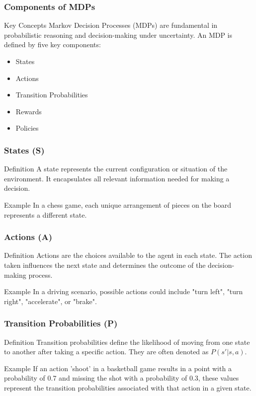 \documentclass[aspectratio=169]{beamer}
\begin{document}
\begin{frame}[fragile]
    \frametitle{Components of MDPs}
    \begin{block}{Key Concepts}
        Markov Decision Processes (MDPs) are fundamental in probabilistic reasoning and decision-making under uncertainty. An MDP is defined by five key components:
        \begin{itemize}
            \item States
            \item Actions
            \item Transition Probabilities
            \item Rewards
            \item Policies
        \end{itemize}
    \end{block}
\end{frame}

\begin{frame}[fragile]
    \frametitle{States (S)}
    \begin{block}{Definition}
        A state represents the current configuration or situation of the environment. It encapsulates all relevant information needed for making a decision.
    \end{block}
    \begin{block}{Example}
        In a chess game, each unique arrangement of pieces on the board represents a different state.
    \end{block}
\end{frame}

\begin{frame}[fragile]
    \frametitle{Actions (A)}
    \begin{block}{Definition}
        Actions are the choices available to the agent in each state. The action taken influences the next state and determines the outcome of the decision-making process.
    \end{block}
    \begin{block}{Example}
        In a driving scenario, possible actions could include "turn left", "turn right", "accelerate", or "brake".
    \end{block}
\end{frame}

\begin{frame}[fragile]
    \frametitle{Transition Probabilities (P)}
    \begin{block}{Definition}
        Transition probabilities define the likelihood of moving from one state to another after taking a specific action. They are often denoted as \( P(s' | s, a) \).
    \end{block}
    \begin{block}{Example}
        If an action 'shoot' in a basketball game results in a point with a probability of 0.7 and missing the shot with a probability of 0.3, these values represent the transition probabilities associated with that action in a given state.
    \end{block}
\end{frame}
\end{document}
